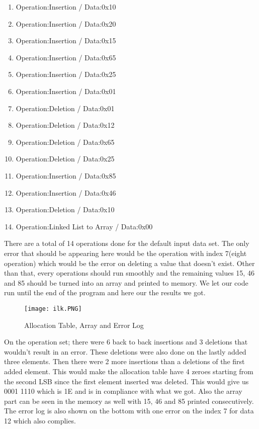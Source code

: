 \documentclass[pdftex,12pt,a4paper]{article}
\begin{document}
\begin{enumerate}
  \item Operation:Insertion / Data:0x10
  \item Operation:Insertion / Data:0x20
  \item Operation:Insertion / Data:0x15
  \item Operation:Insertion / Data:0x65
  \item Operation:Insertion / Data:0x25
  \item Operation:Insertion / Data:0x01
  \item Operation:Deletion / Data:0x01
  \item Operation:Deletion / Data:0x12
  \item Operation:Deletion / Data:0x65
  \item Operation:Deletion / Data:0x25
  \item Operation:Insertion / Data:0x85
  \item Operation:Insertion / Data:0x46
  \item Operation:Deletion / Data:0x10
  \item Operation:Linked List to Array / Data:0x00
\end{enumerate}

There are a total of 14 operations done for the default input data set. The only error that should be appearing here would be the operation with index 7(eight operation) which would be the error on deleting a value that doesn't exist. Other than that, every operations should run smoothly and the remaining values 15, 46 and 85 should be turned into an array and printed to memory. We let our code run until the end of the program and here our the results we got. 

\begin{figure}[H]
	\centering
	\texttt{[image: ilk.PNG]}	
	\caption{Allocation Table, Array and Error Log}
	\label{fig1}
\end{figure}

On the operation set; there were 6 back to back insertions and 3 deletions that wouldn't result in an error. These deletions were also done on the lastly added three elements. Then there were 2 more insertions than a deletions of the first added element. This would make the allocation table have 4 zeroes starting from the second LSB since the first element inserted was deleted. This would give us 0001 1110 which is 1E and is in compliance with what we got. Also the array part can be seen in the memory as well with 15, 46 and 85 printed consecutively. The error log is also shown on the bottom with one error on the index 7 for data 12 which also complies.
\end{document}

